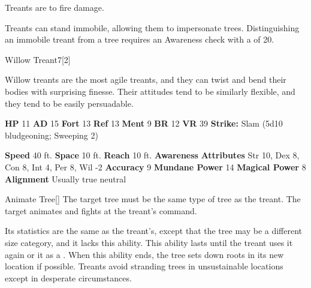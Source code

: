         Treants are  to fire damage.
      
        Treants can stand immobile, allowing them to impersonate trees.
        Distinguishing an immobile treant from a tree requires an Awareness check with a  of 20.
  

  \begin{monsubsection}{Willow Treant}{7}[2]
    \vspace{-1em}\vspace{-1em}
    \vspace{0em}

    
          Willow treants are the most agile treants, and they can twist and bend their bodies with surprising finesse.
          Their attitudes tend to be similarly flexible, and they tend to be easily persuadable.
        

    \begin{spellcontent}
      \begin{spelltargetinginfo}
        \pari \textbf{HP} 11 \monsep
          \textbf{AD} 15 \monsep
          \textbf{Fort} 13 \monsep
          \textbf{Ref} 13 \monsep
          \textbf{Ment} 9
        \pari \textbf{BR} 12 \monsep
        \textbf{VR} 39
        \pari \textbf{Strike:}
            Slam  (5d10 bludgeoning; Sweeping 2)
      \end{spelltargetinginfo}
    \end{spellcontent}
    \begin{monsterfooter}
      \pari \textbf{Speed} 40 ft. \monsep
        \textbf{Space} 10 ft. \monsep
        \textbf{Reach} 10 ft.
      \pari \textbf{Awareness} 
      \pari \textbf{Attributes}
        Str 10, Dex 8,
        Con 8, Int 4,
        Per 8, Wil -2
      \pari \textbf{Accuracy} 9 \monsep
        \textbf{Mundane Power} 14 \monsep
      \textbf{Magical Power} 8
      \pari \textbf{Alignment} Usually true neutral
    \end{monsterfooter}
  \end{monsubsection}
  \begin{freeability}{Animate Tree}[]
      The target tree must be the same type of tree as the treant.
        The target animates and fights at the treant's command.

        Its statistics are the same as the treant's, except that the tree may be a different size category, and it lacks this ability.
        This ability lasts until the treant uses it again or  it as a .
        When this ability ends, the tree sets down roots in its new location if possible.
        Treants avoid stranding trees in unsustainable locations except in desperate circumstances.
    \end{freeability}
  
